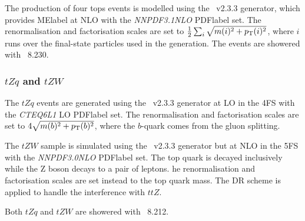 \subsubsection{\ttbar\ttbar}
The production of four tops events is modelled using the \MGMCatNLO~v2.3.3 generator, which provides \acrshort{MElabel} at NLO with the \textit{NNPDF3.1NLO} \acrshort{PDFlabel} set. The renormalisation and factorisation scales are set to $\frac{1}{2}\sum_i\sqrt{m(i)^2+p_{\text{T}}(i)^2}$, where $i$ runs over the final-state particles used in the generation. The events are showered with \PYTHIA~8.230.

\subsubsection{$tZq$ and $tZW$}
The $tZq$ events are generated using the \MGMCatNLO~v2.3.3 generator at LO in the 4FS with the \textit{CTEQ6L1} LO \acrshort{PDFlabel} set. The renormalisation and factorisation scales are set to $4\sqrt{m(b)^2+p_{\text{T}}(b)^2}$, where the $b$-quark comes from the gluon splitting.

The $tZW$ sample is simulated using the \MGMCatNLO~v2.3.3 generator but at NLO in the 5FS with the \textit{NNPDF3.0NLO} \acrshort{PDFlabel} set. The top quark is decayed inclusively while the Z boson decays to a pair of leptons. he renormalisation and factorisation scales are set instead to the top quark mass. The DR scheme is applied to handle the interference with $ttZ$.

Both $tZq$ and $tZW$ are showered with \PYTHIA~8.212.